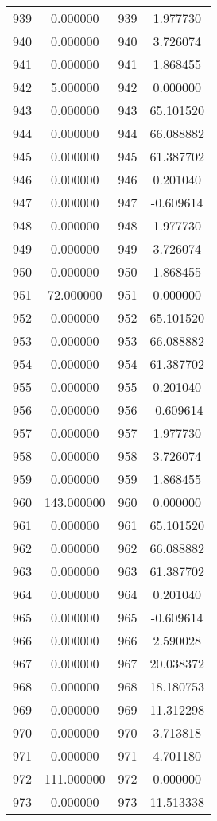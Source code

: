 \documentclass[12pt]{article}
\begin{document}
\begin{longtable}{@{}cccc@{}}
939 & 0.000000 & 939 & 1.977730 \\
940 & 0.000000 & 940 & 3.726074 \\
941 & 0.000000 & 941 & 1.868455 \\
942 & 5.000000 & 942 & 0.000000 \\
943 & 0.000000 & 943 & 65.101520 \\
944 & 0.000000 & 944 & 66.088882 \\
945 & 0.000000 & 945 & 61.387702 \\
946 & 0.000000 & 946 & 0.201040 \\
947 & 0.000000 & 947 & -0.609614 \\
948 & 0.000000 & 948 & 1.977730 \\
949 & 0.000000 & 949 & 3.726074 \\
950 & 0.000000 & 950 & 1.868455 \\
951 & 72.000000 & 951 & 0.000000 \\
952 & 0.000000 & 952 & 65.101520 \\
953 & 0.000000 & 953 & 66.088882 \\
954 & 0.000000 & 954 & 61.387702 \\
955 & 0.000000 & 955 & 0.201040 \\
956 & 0.000000 & 956 & -0.609614 \\
957 & 0.000000 & 957 & 1.977730 \\
958 & 0.000000 & 958 & 3.726074 \\
959 & 0.000000 & 959 & 1.868455 \\
960 & 143.000000 & 960 & 0.000000 \\
961 & 0.000000 & 961 & 65.101520 \\
962 & 0.000000 & 962 & 66.088882 \\
963 & 0.000000 & 963 & 61.387702 \\
964 & 0.000000 & 964 & 0.201040 \\
965 & 0.000000 & 965 & -0.609614 \\
966 & 0.000000 & 966 & 2.590028 \\
967 & 0.000000 & 967 & 20.038372 \\
968 & 0.000000 & 968 & 18.180753 \\
969 & 0.000000 & 969 & 11.312298 \\
970 & 0.000000 & 970 & 3.713818 \\
971 & 0.000000 & 971 & 4.701180 \\
972 & 111.000000 & 972 & 0.000000 \\
973 & 0.000000 & 973 & 11.513338 \\

\end{longtable}
\end{document}
